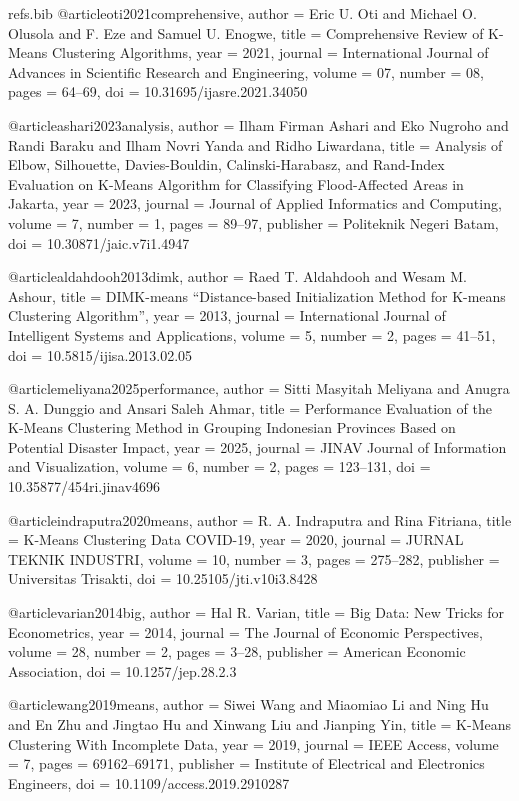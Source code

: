 \begin{filecontents*}[overwrite]{refs.bib}
@article{oti2021comprehensive,
  author = {Eric U. Oti and Michael O. Olusola and F. Eze and Samuel U. Enogwe},
  title = {{Comprehensive Review of K-Means Clustering Algorithms}},
  year = {2021},
  journal = {International Journal of Advances in Scientific Research and Engineering},
  volume = {07},
  number = {08},
  pages = {64--69},
  doi = {10.31695/ijasre.2021.34050}
}

@article{ashari2023analysis,
  author = {Ilham Firman Ashari and Eko Nugroho and Randi Baraku and Ilham Novri Yanda and Ridho Liwardana},
  title = {{Analysis of Elbow, Silhouette, Davies-Bouldin, Calinski-Harabasz, and Rand-Index Evaluation on K-Means Algorithm for Classifying Flood-Affected Areas in Jakarta}},
  year = {2023},
  journal = {Journal of Applied Informatics and Computing},
  volume = {7},
  number = {1},
  pages = {89--97},
  publisher = {Politeknik Negeri Batam},
  doi = {10.30871/jaic.v7i1.4947}
}

@article{aldahdooh2013dimk,
  author = {Raed T. Aldahdooh and Wesam M. Ashour},
  title = {{DIMK-means ``Distance-based Initialization Method for K-means Clustering Algorithm''}},
  year = {2013},
  journal = {International Journal of Intelligent Systems and Applications},
  volume = {5},
  number = {2},
  pages = {41--51},
  doi = {10.5815/ijisa.2013.02.05}
}

@article{meliyana2025performance,
  author = {Sitti Masyitah Meliyana and Anugra S. A. Dunggio and Ansari Saleh Ahmar},
  title = {{Performance Evaluation of the K-Means Clustering Method in Grouping Indonesian Provinces Based on Potential Disaster Impact}},
  year = {2025},
  journal = {JINAV Journal of Information and Visualization},
  volume = {6},
  number = {2},
  pages = {123--131},
  doi = {10.35877/454ri.jinav4696}
}

@article{indraputra2020means,
  author = {R. A. Indraputra and Rina Fitriana},
  title = {{K-Means Clustering Data COVID-19}},
  year = {2020},
  journal = {JURNAL TEKNIK INDUSTRI},
  volume = {10},
  number = {3},
  pages = {275--282},
  publisher = {Universitas Trisakti},
  doi = {10.25105/jti.v10i3.8428}
}

@article{varian2014big,
  author = {Hal R. Varian},
  title = {{Big Data: New Tricks for Econometrics}},
  year = {2014},
  journal = {The Journal of Economic Perspectives},
  volume = {28},
  number = {2},
  pages = {3--28},
  publisher = {American Economic Association},
  doi = {10.1257/jep.28.2.3}
}

@article{wang2019means,
  author = {Siwei Wang and Miaomiao Li and Ning Hu and En Zhu and Jingtao Hu and Xinwang Liu and Jianping Yin},
  title = {{K-Means Clustering With Incomplete Data}},
  year = {2019},
  journal = {IEEE Access},
  volume = {7},
  pages = {69162--69171},
  publisher = {Institute of Electrical and Electronics Engineers},
  doi = {10.1109/access.2019.2910287}
}


\end{filecontents*}
